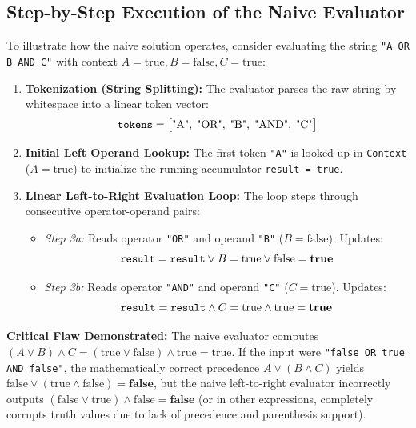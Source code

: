 \documentclass[12pt,a4paper]{article}
\begin{document}
\subsection{Step-by-Step Execution of the Naive Evaluator}
To illustrate how the naive solution operates, consider evaluating the string \texttt{"A OR B AND C"} with context $A=\text{true}, B=\text{false}, C=\text{true}$:
\begin{enumerate}
    \item \textbf{Tokenization (String Splitting):} The evaluator parses the raw string by whitespace into a linear token vector:
    \begin{equation*}
        \text{\texttt{tokens}} = \big[\text{"A"}, \; \text{"OR"}, \; \text{"B"}, \; \text{"AND"}, \; \text{"C"}\big]
    \end{equation*}
    \item \textbf{Initial Left Operand Lookup:} The first token \texttt{"A"} is looked up in \texttt{Context} ($A = \text{true}$) to initialize the running accumulator \texttt{result = true}.
    \item \textbf{Linear Left-to-Right Evaluation Loop:} The loop steps through consecutive operator-operand pairs:
    \begin{itemize}
        \item \textit{Step 3a:} Reads operator \texttt{"OR"} and operand \texttt{"B"} ($B = \text{false}$). Updates:
        \begin{equation*}
            \text{\texttt{result}} = \text{\texttt{result}} \lor B = \text{true} \lor \text{false} = \mathbf{true}
        \end{equation*}
        \item \textit{Step 3b:} Reads operator \texttt{"AND"} and operand \texttt{"C"} ($C = \text{true}$). Updates:
        \begin{equation*}
            \text{\texttt{result}} = \text{\texttt{result}} \land C = \text{true} \land \text{true} = \mathbf{true}
        \end{equation*}
    \end{itemize}
\end{enumerate}

\textbf{Critical Flaw Demonstrated:} The naive evaluator computes $(A \lor B) \land C = (\text{true} \lor \text{false}) \land \text{true} = \text{true}$. If the input were \texttt{"false OR true AND false"}, the mathematically correct precedence $A \lor (B \land C)$ yields $\text{false} \lor (\text{true} \land \text{false}) = \mathbf{false}$, but the naive left-to-right evaluator incorrectly outputs $(\text{false} \lor \text{true}) \land \text{false} = \mathbf{false}$ (or in other expressions, completely corrupts truth values due to lack of precedence and parenthesis support).
\end{document}
